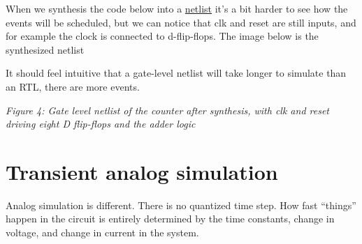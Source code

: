 \begin{Shaded}
\begin{Highlighting}[]
 \KeywordTok{\textasciigrave{}}\KeywordTok{\textasciigrave{}}

\KeywordTok{\textasciigrave{}}\KeywordTok{\textasciigrave{}}

\KeywordTok{\textasciigrave{}}\KeywordTok{\textasciigrave{}}\ErrorTok{(}\KeywordTok{)}

\KeywordTok{\textasciigrave{}}\KeywordTok{\textasciigrave{}}
    \ErrorTok{(}\KeywordTok{)} 

\end{Highlighting}
\end{Shaded}

When we synthesis the code below into a
\href{https://github.com/wulffern/dicex/blob/main/sim/verilog/counter_sv/counter_netlist.v}{netlist}
it's a bit harder to see how the events will be scheduled, but we can
notice that clk and reset are still inputs, and for example the clock is
connected to d-flip-flops. The image below is the synthesized netlist

It should feel intuitive that a gate-level netlist will take longer to
simulate than an RTL, there are more events.


{
\centering
{}
}

\emph{Figure 4: Gate level netlist of the counter after synthesis, with
clk and reset driving eight D flip-flops and the adder logic}

\section{Transient analog simulation}\label{transient-analog-simulation}

Analog simulation is different. There is no quantized time step. How
fast ``things'' happen in the circuit is entirely determined by the time
constants, change in voltage, and change in current in the system.

